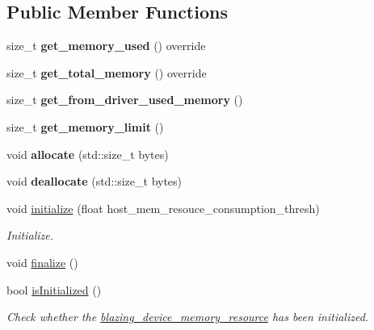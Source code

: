 \subsection*{Public Member Functions}
\begin{DoxyCompactItemize}
\item 
\mbox{\label{classblazing__host__memory__resource_a3ada1edd4d72ed90b5b545e83590fcb1}} 
size\+\_\+t {\bfseries get\+\_\+memory\+\_\+used} () override
\item 
\mbox{\label{classblazing__host__memory__resource_aaf5b08aae1b6d60fdf30c1b4cb0b0ed2}} 
size\+\_\+t {\bfseries get\+\_\+total\+\_\+memory} () override
\item 
\mbox{\label{classblazing__host__memory__resource_a15c8bcb4ef3618d82a18bf8dd3909ef5}} 
size\+\_\+t {\bfseries get\+\_\+from\+\_\+driver\+\_\+used\+\_\+memory} ()
\item 
\mbox{\label{classblazing__host__memory__resource_a91cb1fe1caf14c6fd2c42a12cc51e116}} 
size\+\_\+t {\bfseries get\+\_\+memory\+\_\+limit} ()
\item 
\mbox{\label{classblazing__host__memory__resource_aae6e1f9fe638d2bd4924451656d0a3dd}} 
void {\bfseries allocate} (std\+::size\+\_\+t bytes)
\item 
\mbox{\label{classblazing__host__memory__resource_aaab7cf28a013ae371d4c5850041679b5}} 
void {\bfseries deallocate} (std\+::size\+\_\+t bytes)
\item 
void \hyperlink{classblazing__host__memory__resource_a24f72f410d6ef29937661e2fe79fd292}{initialize} (float host\+\_\+mem\+\_\+resouce\+\_\+consumption\+\_\+thresh)
\begin{DoxyCompactList}\small\item\em Initialize. \end{DoxyCompactList}\item 
void \hyperlink{classblazing__host__memory__resource_a05d933cea38920323a6d9d006019fac3}{finalize} ()
\item 
bool \hyperlink{classblazing__host__memory__resource_a863f02392dbfc839f87b8b3a2a6cff9e}{is\+Initialized} ()
\begin{DoxyCompactList}\small\item\em Check whether the \hyperlink{classblazing__device__memory__resource}{blazing\+\_\+device\+\_\+memory\+\_\+resource} has been initialized. \end{DoxyCompactList}\end{DoxyCompactItemize}
